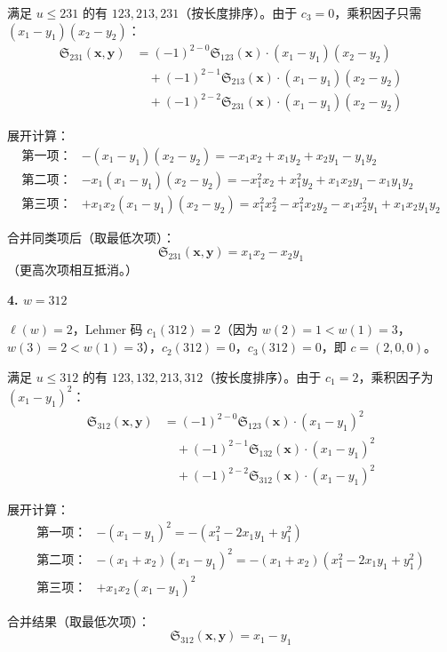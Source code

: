 \begin{Example}[$S_3$ 的计算]
满足 $u \leq 231$ 的有 $123, 213, 231$（按长度排序）。由于 $c_3 = 0$，乘积因子只需 $(x_1-y_1)(x_2-y_2)$：
\begin{align*}
\mathfrak{S}_{231}(\mathbf{x},\mathbf{y}) &= (-1)^{2-0} \mathfrak{S}_{123}(\mathbf{x}) \cdot (x_1-y_1)(x_2-y_2) \\
&\quad + (-1)^{2-1} \mathfrak{S}_{213}(\mathbf{x}) \cdot (x_1-y_1)(x_2-y_2) \\
&\quad + (-1)^{2-2} \mathfrak{S}_{231}(\mathbf{x}) \cdot (x_1-y_1)(x_2-y_2)
\end{align*}

展开计算：
\begin{align*}
第一项：&-(x_1-y_1)(x_2-y_2) = -x_1 x_2 + x_1 y_2 + x_2 y_1 - y_1 y_2 \\
第二项：&-x_1 (x_1-y_1)(x_2-y_2) = -x_1^2 x_2 + x_1^2 y_2 + x_1 x_2 y_1 - x_1 y_1 y_2 \\
第三项：&+x_1 x_2 (x_1-y_1)(x_2-y_2) = x_1^2 x_2^2 - x_1^2 x_2 y_2 - x_1 x_2^2 y_1 + x_1 x_2 y_1 y_2
\end{align*}

合并同类项后（取最低次项）：
$$\mathfrak{S}_{231}(\mathbf{x},\mathbf{y}) = x_1 x_2 - x_2 y_1$$
（更高次项相互抵消。）

\textbf{4. $w = 312$}

$\ell(w) = 2$，Lehmer 码 $c_1(312) = 2$（因为 $w(2)=1 < w(1)=3$，$w(3)=2 < w(1)=3$），$c_2(312) = 0$，$c_3(312) = 0$，即 $c = (2,0,0)$。

满足 $u \leq 312$ 的有 $123, 132, 213, 312$（按长度排序）。由于 $c_1 = 2$，乘积因子为 $(x_1-y_1)^2$：
\begin{align*}
\mathfrak{S}_{312}(\mathbf{x},\mathbf{y}) &= (-1)^{2-0} \mathfrak{S}_{123}(\mathbf{x}) \cdot (x_1-y_1)^2 \\
&\quad + (-1)^{2-1} \mathfrak{S}_{132}(\mathbf{x}) \cdot (x_1-y_1)^2 \\
&\quad + (-1)^{2-2} \mathfrak{S}_{312}(\mathbf{x}) \cdot (x_1-y_1)^2
\end{align*}

展开计算：
\begin{align*}
第一项：&-(x_1-y_1)^2 = -(x_1^2 - 2x_1 y_1 + y_1^2) \\
第二项：&-(x_1+x_2)(x_1-y_1)^2 = -(x_1+x_2)(x_1^2 - 2x_1 y_1 + y_1^2) \\
第三项：&+x_1 x_2 (x_1-y_1)^2
\end{align*}

合并结果（取最低次项）：
$$\mathfrak{S}_{312}(\mathbf{x},\mathbf{y}) = x_1 - y_1$$


\end{Example}
